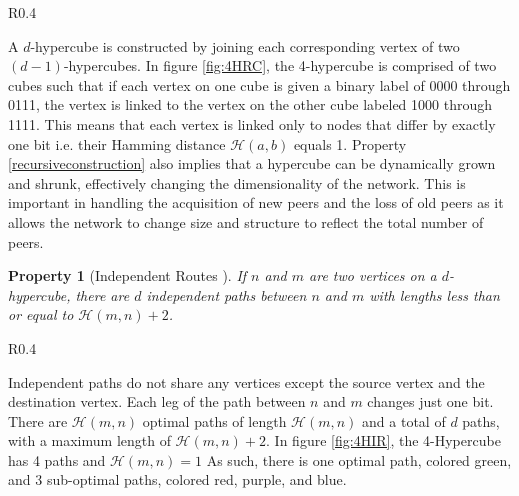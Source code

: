 \documentclass[12pt]{report}
\theoremstyle{plain}
\newtheorem{property}{Property}
\begin{document}
		
		\begin{wrapfigure}{R}{0.4\columnwidth}
			\vspace{-1cm}
		    \centering
			
		    \captionsetup{justification=centering}
		    \caption{Recursive Construction of \\a 4-Hypercube}
		    \label{fig:4HRC}
	    \end{wrapfigure}
		A $d$-hypercube is constructed by joining each corresponding vertex of two $(d-1)$-hypercubes. 
		In figure \ref{fig:4HRC},
		the 4-hypercube is comprised of two cubes such that if each vertex on one cube is given a binary label of 0000 through 0111,
		the vertex is linked to the vertex on the other cube labeled 1000 through 1111.
		This means that each vertex is linked only to nodes that differ by exactly one bit i.e. their Hamming distance $\mathcal{H}(a,b)$ equals 1.
		Property \ref{recursiveconstruction} also implies that a hypercube can be dynamically grown and shrunk,
		effectively changing the dimensionality of the network.
		This is important in handling the acquisition of new peers and the loss of old peers as it allows the network to change size 
		and structure to reflect the total number of peers.
	
		
		\begin{property}[Independent Routes \cite{saad_topological_1988}]
			\label{independentroutes}
			If $n$ and $m$ are two vertices on a $d$-hypercube, 
			there are $d$ independent paths between $n$ and $m$ with lengths less than or equal to $\mathcal{H}(m,n)+2$.
		\end{property}

	    \begin{wrapfigure}{R}{0.4\columnwidth}
		    \centering
			
		    \captionsetup{justification=centering}
		    \caption{Independent Routes in \\a 4-Hypercube}
		    \label{fig:4HIR}
	    \end{wrapfigure}

		Independent paths do not share any vertices except the source vertex and the destination vertex.
		Each leg of the path between $n$ and $m$ changes just one bit.
		There are $\mathcal{H}(m,n)$ optimal paths of length $\mathcal{H}(m,n)$ and a total of $d$ paths,
		with a maximum length of $\mathcal{H}(m,n)+2$.
		In figure \ref{fig:4HIR}, the 4-Hypercube has 4 paths and $\mathcal{H}(m,n)=1$
		As such, there is one optimal path, colored green, and 3 sub-optimal paths, colored red, purple, and blue.
\end{document}
